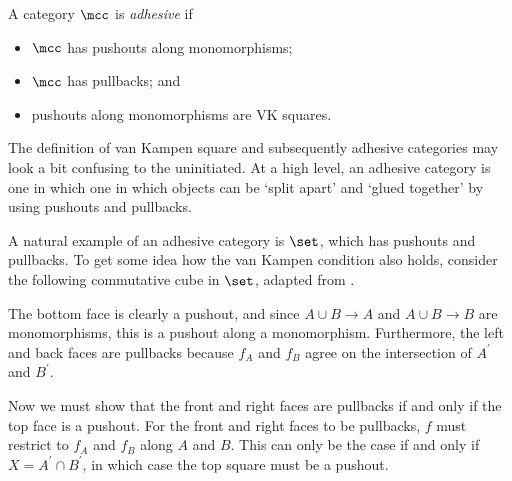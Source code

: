 \begin{definition}
    A category \(\mcc\) is \emph{adhesive} if
    \begin{itemize}
        \item \(\mcc\) has pushouts along monomorphisms;
        \item \(\mcc\) has pullbacks; and
        \item pushouts along monomorphisms are VK squares.
    \end{itemize}
\end{definition}

The definition of van Kampen square and subsequently adhesive categories may
look a bit confusing to the uninitiated.
At a high level, an adhesive category is one in which one in which objects can
be `split apart' and `glued together' by using pushouts and pullbacks.

\begin{example}
    A natural example of an adhesive category is \(\set\), which has pushouts
    and pullbacks.
    To get some idea how the van Kampen condition also holds, consider the
    following commutative cube in \(\set\), adapted from
    \cite[Sec. 4.3]{kissinger2012pictures}.
    \begin{center}
    \end{center}
    The bottom face is clearly a pushout, and since \(A \cup B \to A\) and
    \(A \cup B \to B\) are monomorphisms, this is a pushout along a
    monomorphism.
    Furthermore, the left and back faces are pullbacks because \(f_A\) and
    \(f_B\) agree on the intersection of \(A^\prime\) and \(B^\prime\).

    Now we must show that the front and right faces are pullbacks if and only if
    the top face is a pushout.
    For the front and right faces to be pullbacks, \(f\) must restrict to
    \(f_A\) and \(f_B\) along \(A\) and \(B\).
    This can only be the case if and only if \(X = A^\prime \cap B^\prime\), in
    which case the top square must be a pushout.
\end{example}

